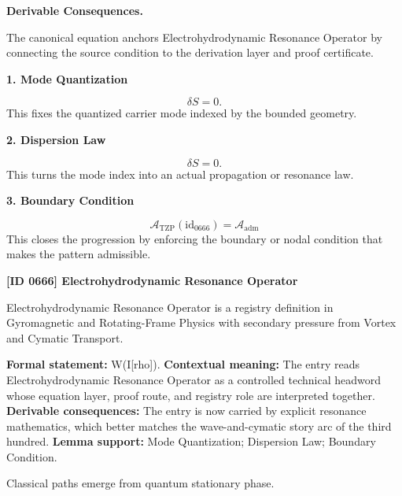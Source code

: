 \par\vspace{0.35em}
\noindent\textbf{Derivable Consequences.}\quad
\begingroup
\footnotesize
\raggedright
The canonical equation anchors Electrohydrodynamic Resonance Operator by connecting the source condition to the derivation layer and proof certificate.
\par\endgroup

\noindent\textbf{1. Mode Quantization}\par
\[
\delta S = 0.
\]
\noindent This fixes the quantized carrier mode indexed by the bounded geometry.\par
\noindent\textbf{2. Dispersion Law}\par
\[
\boxed{\delta S = 0.}
\]
\noindent This turns the mode index into an actual propagation or resonance law.\par
\noindent\textbf{3. Boundary Condition}\par
\[
\mathcal{A}_{\mathrm{TZP}}(\mathrm{id}_{0666})=\mathcal{A}_{\mathrm{adm}}
\]
\noindent This closes the progression by enforcing the boundary or nodal condition that makes the pattern admissible.\par

\clearpage
\noindent\textbf{[ID 0666] Electrohydrodynamic Resonance Operator}\par
\vspace{0.35em}
\begingroup\small
{}
Electrohydrodynamic Resonance Operator is a registry definition in Gyromagnetic and Rotating-Frame Physics with secondary pressure from Vortex and Cymatic Transport.

\begingroup\footnotesize\setlength{\emergencystretch}{3em}\sloppy
\textbf{Formal statement:} W(I[rho]). \textbf{Contextual meaning:} The entry reads Electrohydrodynamic Resonance Operator as a controlled technical headword whose equation layer, proof route, and registry role are interpreted together. \textbf{Derivable consequences:} The entry is now carried by explicit resonance mathematics, which better matches the wave-and-cymatic story arc of the third hundred. \textbf{Lemma support:} Mode Quantization; Dispersion Law; Boundary Condition.\par
\endgroup

Classical paths emerge from quantum stationary phase.


